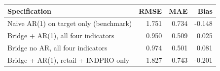 \begin{tabular}{lrrr}
\toprule
Specification & RMSE & MAE & Bias \\
\midrule
Naive AR(1) on target only (benchmark) & 1.751 & 0.734 & -0.148 \\
\midrule
Bridge + AR(1), all four indicators & 0.950 & 0.509 & 0.025 \\
Bridge no AR, all four indicators & 0.974 & 0.501 & 0.081 \\
Bridge + AR(1), retail + INDPRO only & 1.827 & 0.743 & -0.201 \\
\bottomrule
\end{tabular}
